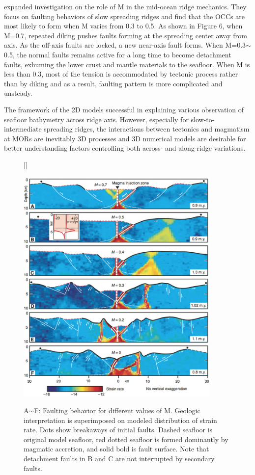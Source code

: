\documentclass[12pt]{article}
\begin{document}
\citet{Tucholke2008} expanded investigation on the role of M in the mid-ocean ridge mechanics. They focus on faulting behaviors of slow spreading ridges and find that the OCCs are most likely to form when M varies from 0.3 to 0.5. As shown in Figure 6, when M=0.7, repeated diking pushes faults forming at the spreading center away from axis. As the off-axis faults are locked, a new near-axis fault forms. When M=0.3$\sim$0.5, the normal faults remains active for a long time to become detachment faults, exhuming the lower crust and mantle materials to the seafloor. When M is less than 0.3, most of the tension is accommodated by tectonic process rather than by diking and as a result, faulting pattern is more complicated and unsteady.

The  framework of the 2D models  successful in explaining various observation of seafloor bathymetry across ridge axis. However, especially for slow-to-intermediate spreading ridges, the interactions between tectonics and magmatism at MORs are inevitably 3D processes and 3D numerical models are desirable for better understanding factors controlling both across- and along-ridge variations.

\begin{figure}[H]
[\FBwidth]
{\caption{\small A$\sim$F: Faulting behavior for different values of M. Geologic interpretation is superimposed on modeled distribution of strain rate. Dots show breakaways of initial faults. Dashed seafloor is original model seafloor, red dotted seafloor is formed dominantly by magmatic accretion, and solid bold is fault surface. Note that detachment faults in B and C are not interrupted by secondary faults. \citep{Tucholke2008}}}
 {\includegraphics[width=10cm]{fig6_1.png}} 
 \label{fig6_1}
\end{figure}
\end{document}
